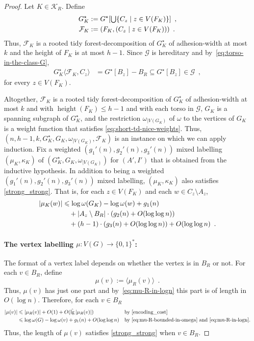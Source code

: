 \documentclass[twoside,leqno]{article}
\let\eqref\cref
\renewcommand{\le}{\leqslant}
\renewcommand{\leq}{\leqslant}
\newcommand{\torso}[2]{{#1}\langle{#2}\rangle}
\DeclareMathOperator{\height}{height}
\DeclareMathOperator{\lgg}{\hat{lg}}
\newcommand{\Oh}{O}
\DeclarePairedDelimiter{\set}{\{}{\}}
\begin{document}
\begin{proof}
  Let $K\in\mathcal{K}_R$. Define
  \begin{align*}
    G^\star_K
     & :=G^\star[\textstyle\bigcup\set{C_z\mid z\in V(F_K)}]\enspace, \\
    \mathcal{F}_K
     & :=(F_K, (C_z \mid z\in V(F_K)))\enspace.
  \end{align*}
  Thus, $\mathcal{F}_K$ is a rooted tidy forest-decomposition of $G^\star_K$ of adhesion-width at most $k$ and the height of $F_K$ is at most $h-1$.
  Since $\mathcal{G}$ is hereditary and by~\eqref{eq:torso-in-the-class-G},
  \begin{align*}
    \torso{G^\star_K}{\mathcal{F}_K,C_z}
     & =G^\star[B_z]-B_R\subseteq G^\star[B_z]\in \mathcal{G}\enspace ,
  \end{align*}
  for every $z \in V(F_K)$.

  Altogether, $\mathcal{F}_K$ is a rooted tidy forest-decomposition of $G^\star_K$ of adhesion-width at most $k$ and with $\height(F_K)\le h-1$ and with each torso in $\mathcal{G}$, $G_K$ is a spanning subgraph of $G^\star_K$, and the restriction
  $\omega_{|V(G_K)}$ of $\omega$ to the vertices of $G_K$ is a weight function that satisfies \eqref{eq:short-td-nice-weights}.  Thus, $(n,h-1,k,G^\star_K,G_K,\omega_{|V(G_K)},\mathcal{F}_K)$ is an instance on which we can apply induction.
  Fix a weighted $(g_1'(n),g_2'(n),g_3'(n))$ mixed labelling $(\mu_K,\kappa_K)$ of $(G^\star_K,G_K,\omega_{|V(G_K)})$ for $(A',I')$ that is obtained from the inductive hypothesis.
  In addition to being a weighted $(g_1'(n),g_2'(n),g_3'(n))$ mixed labelling, $(\mu_K,\kappa_K)$ also satisfies \eqref{strong_strong}.  That is, for each $z\in V(F_K)$ and each $w\in C_z\setminus A_z$,
  \begin{align}
    |\mu_K(w)|
     & \le \log \omega(G_K) - \log\omega(w) + g_1(n) \notag                                \\
     & \quad {} + |A_z\setminus B_R|\cdot (g_2(n) + \Oh(\log\log n)) \label{mu_Kw}         \\
     & \quad {} + (h-1)\cdot (g_3(n) + \Oh(\log\log n)) +\Oh(\log\log n) \enspace . \notag
  \end{align}

  \paragraph{The vertex labelling $\mu:V(G)\to\{0,1\}^*$:}
  The format of a vertex label depends on whether the vertex is in $B_R$ or not.
  For each $v\in B_R$, define
  \[
    \mu(v) := \langle\mu_R(v)\rangle\enspace.
  \]
  Thus, $\mu(v)$ has just one part and
  by~\eqref{eq:mu-R-in-logn} this part is of length in $\Oh(\log n)$.
  Therefore,
  for each $v\in B_R$
  \begin{align*}
    |\mu(v)|
     & \leq |\mu_R(v)| + \Oh(1) + \Oh(\lgg|\mu_R(v)|)                &  & \text{by~\eqref{encoding_cost}}                                           \\
     & \leq \log\omega(G) - \log\omega(v) + g_1(n) + \Oh(\log\log n) &  & \textrm{by~\eqref{eq:mu-R-bounded-in-omega} and~\eqref{eq:mu-R-in-logn}.}
  \end{align*}
  Thus, the length of $\mu(v)$ satisfies \eqref{strong_strong} when $v\in B_R$.


\end{proof}
\end{document}
